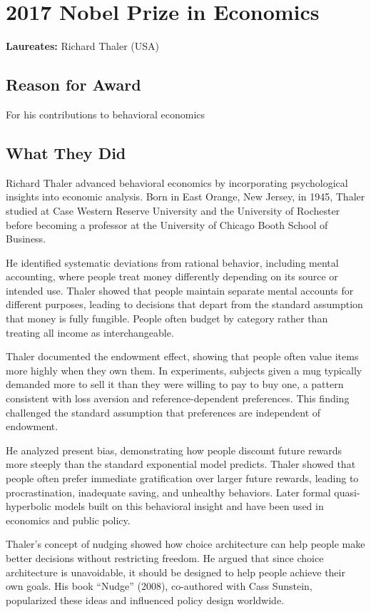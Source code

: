\chapter{2017 Nobel Prize in Economics}
\textbf{Laureates: }Richard Thaler (USA)

\section*{Reason for Award}
For his contributions to behavioral economics

\section{What They Did}
Richard Thaler advanced behavioral economics by incorporating psychological
insights into economic analysis. Born in East Orange, New Jersey, in 1945,
Thaler studied at Case Western Reserve University and the University of Rochester
before becoming a professor at the University of Chicago Booth School of Business.

He identified systematic deviations from rational behavior, including mental
accounting, where people treat money differently depending on its source or
intended use. Thaler showed that people maintain separate mental accounts for
different purposes, leading to decisions that depart from the standard assumption
that money is fully fungible. People often budget by category rather than treating
all income as interchangeable.

Thaler documented the endowment effect, showing that people often value items
more highly when they own them. In experiments, subjects given a mug typically
demanded more to sell it than they were willing to pay to buy one, a pattern
consistent with loss aversion and reference-dependent preferences. This finding
challenged the standard assumption that preferences are independent of endowment.

He analyzed present bias, demonstrating how people discount future rewards more
steeply than the standard exponential model predicts. Thaler showed that people
often prefer immediate gratification over larger future rewards, leading to
procrastination, inadequate saving, and unhealthy behaviors. Later formal
quasi-hyperbolic models built on this behavioral insight and have been used in
economics and public policy.

Thaler's concept of nudging showed how choice architecture can help people
make better decisions without restricting freedom. He argued that since choice
architecture is unavoidable, it should be designed to help people achieve their
own goals. His book ``Nudge'' (2008), co-authored with Cass Sunstein, popularized
these ideas and influenced policy design worldwide.


